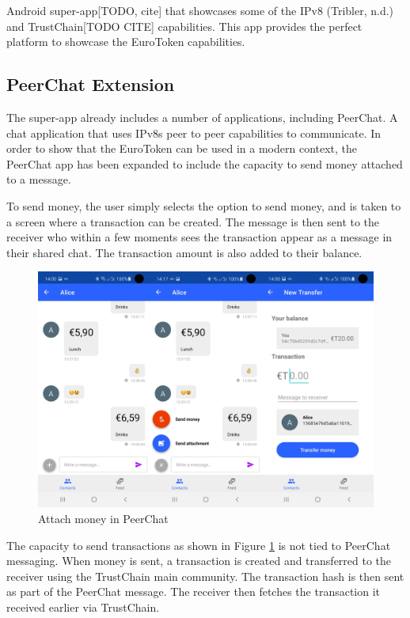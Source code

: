 \documentclass[whitelogo]{tudelft-report}
\begin{document}
Android super-app{[}TODO, cite{]} that showcases some of the IPv8
(Tribler, n.d.) and TrustChain{[}TODO CITE{]} capabilities. This app
provides the perfect platform to showcase the EuroToken capabilities.

\subsection{PeerChat Extension}\label{peerchat-extension}

The super-app already includes a number of applications, including
PeerChat. A chat application that uses IPv8s peer to peer capabilities
to communicate. In order to show that the EuroToken can be used in a
modern context, the PeerChat app has been expanded to include the
capacity to send money attached to a message.

To send money, the user simply selects the option to send money, and is
taken to a screen where a transaction can be created. The message is
then sent to the receiver who within a few moments sees the transaction
appear as a message in their shared chat. The transaction amount is also
added to their balance.

\begin{figure}[htbp]
\centering
\includegraphics{../images/peerchat_send_money2.jpg}
\caption{Attach money in PeerChat \label{send_money_label}}
\end{figure}

The capacity to send transactions as shown in Figure
\ref{send_money_label} is not tied to PeerChat messaging. When money is
sent, a transaction is created and transferred to the receiver using the
TrustChain main community. The transaction hash is then sent as part of
the PeerChat message. The receiver then fetches the transaction it
received earlier via TrustChain.
\end{document}
